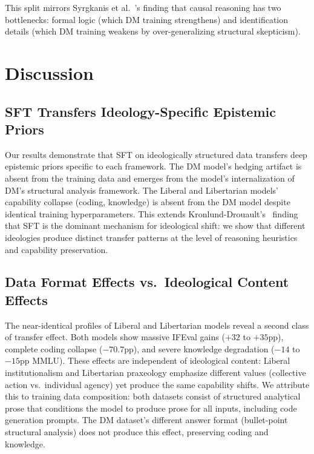 \documentclass[11pt]{article}
\begin{document}
This split mirrors Syrgkanis et al.~\cite{syrgkanis2026causalreasoning}'s finding that causal reasoning has two bottlenecks: formal logic (which DM training strengthens) and identification details (which DM training weakens by over-generalizing structural skepticism).

\section{Discussion}

\subsection{SFT Transfers Ideology-Specific Epistemic Priors}

Our results demonstrate that SFT on ideologically structured data transfers deep epistemic priors specific to each framework. The DM model's hedging artifact is absent from the training data and emerges from the model's internalization of DM's structural analysis framework. The Liberal and Libertarian models' capability collapse (coding, knowledge) is absent from the DM model despite identical training hyperparameters. This extends Kronlund-Drouault's~\cite{kronlund2024propaganda} finding that SFT is the dominant mechanism for ideological shift: we show that different ideologies produce distinct transfer patterns at the level of reasoning heuristics and capability preservation.

\subsection{Data Format Effects vs.\ Ideological Content Effects}

The near-identical profiles of Liberal and Libertarian models reveal a second class of transfer effect. Both models show massive IFEval gains ($+32$ to $+35$pp), complete coding collapse ($-70.7$pp), and severe knowledge degradation ($-14$ to $-15$pp MMLU). These effects are independent of ideological content: Liberal institutionalism and Libertarian praxeology emphasize different values (collective action vs.\ individual agency) yet produce the same capability shifts. We attribute this to training data composition: both datasets consist of structured analytical prose that conditions the model to produce prose for all inputs, including code generation prompts. The DM dataset's different answer format (bullet-point structural analysis) does not produce this effect, preserving coding and knowledge.
\end{document}
